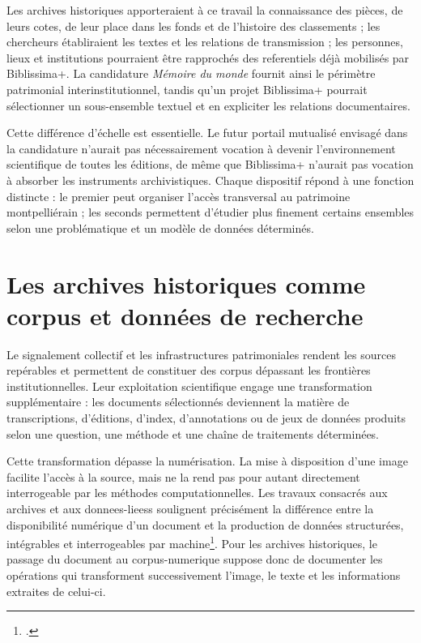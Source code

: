 Les archives historiques apporteraient à ce travail la connaissance des pièces, de leurs cotes, de leur place dans les fonds et de l'histoire des classements ; les chercheurs établiraient les textes et les relations de transmission ; les personnes, lieux et institutions pourraient être rapprochés des \glspl{referentiel} déjà mobilisés par Biblissima+. La candidature \emph{Mémoire du monde} fournit ainsi le périmètre patrimonial interinstitutionnel, tandis qu'un projet Biblissima+ pourrait sélectionner un sous-ensemble textuel et en expliciter les relations documentaires.

Cette différence d'échelle est essentielle. Le futur portail mutualisé envisagé dans la candidature n'aurait pas nécessairement vocation à devenir l'environnement scientifique de toutes les éditions, de même que Biblissima+ n'aurait pas vocation à absorber les instruments archivistiques. Chaque dispositif répond à une fonction distincte : le premier peut organiser l'accès transversal au patrimoine montpelliérain ; les seconds permettent d'étudier plus finement certains ensembles selon une problématique et un modèle de données déterminés.



\chapter{Les archives historiques comme corpus et données de recherche}


Le \gls{signalement} collectif et les infrastructures patrimoniales rendent les sources repérables et permettent de constituer des corpus dépassant les frontières institutionnelles. Leur exploitation scientifique engage une transformation supplémentaire : les documents sélectionnés deviennent la matière de transcriptions, d'éditions, d'index, d'annotations ou de jeux de données produits selon une question, une méthode et une chaîne de traitements déterminées.

Cette transformation dépasse la numérisation. La mise à disposition d'une image facilite l'accès à la source, mais ne la rend pas pour autant directement interrogeable par les méthodes computationnelles. Les travaux consacrés aux archives et aux \glspl{donnees-liees} soulignent précisément la différence entre la disponibilité numérique d'un document et la production de données structurées, intégrables et interrogeables par machine\footcite{Hawkins2022ArchivesLinkedData}. Pour les archives historiques, le passage du document au \gls{corpus-numerique} suppose donc de documenter les opérations qui transforment successivement l'image, le texte et les informations extraites de celui-ci.


